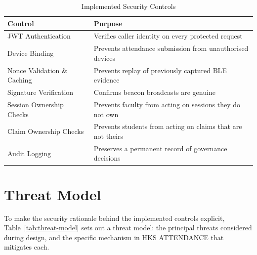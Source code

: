 \documentclass[12pt, a4paper, oneside]{report}
\begin{document}
\begin{table}[htbp]
\centering
\caption{Implemented Security Controls}
\label{tab:security-controls}
\begin{tabularx}{\textwidth}{|l|X|}
\hline
\textbf{Control} & \textbf{Purpose} \\
\hline
JWT Authentication & Verifies caller identity on every protected request \\
\hline
Device Binding & Prevents attendance submission from unauthorised devices \\
\hline
Nonce Validation \& Caching & Prevents replay of previously captured BLE evidence \\
\hline
Signature Verification & Confirms beacon broadcasts are genuine \\
\hline
Session Ownership Checks & Prevents faculty from acting on sessions they do not own \\
\hline
Claim Ownership Checks & Prevents students from acting on claims that are not theirs \\
\hline
Audit Logging & Preserves a permanent record of governance decisions \\
\hline
\end{tabularx}
\end{table}

\section{Threat Model}

To make the security rationale behind the implemented controls explicit, Table~\ref{tab:threat-model} sets out a threat model: the principal threats considered during design, and the specific mechanism in HKS ATTENDANCE that mitigates each.
\end{document}
